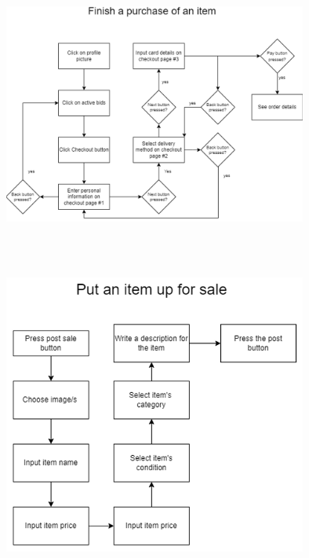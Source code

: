\begin{center}
\includegraphics[width=100mm, height=100mm]{Images/FlowChart/finish_a_purchase_of_an_item.png}\\[1cm]
\includegraphics[width=100mm, height=100mm]{Images/FlowChart/put_an_item_up_for_sale.png}
\end{center}
